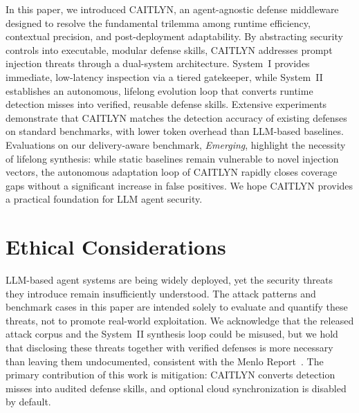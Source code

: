 \documentclass[letterpaper,twocolumn,10pt]{article}
\begin{document}
In this paper, we introduced CAITLYN, an agent-agnostic defense
middleware designed to resolve the fundamental trilemma among runtime
efficiency, contextual precision, and post-deployment adaptability.
By abstracting security controls into executable,
modular defense skills, CAITLYN addresses prompt injection threats
through a dual-system architecture. System~I provides immediate,
low-latency inspection via a tiered gatekeeper, while System~II
establishes an autonomous, lifelong evolution loop that converts
runtime detection misses into verified, reusable defense skills.
Extensive experiments demonstrate that CAITLYN matches the detection
accuracy of existing defenses on standard benchmarks, with
lower token overhead than LLM-based baselines.
Evaluations on our
delivery-aware benchmark, \emph{Emerging}, highlight the necessity of
lifelong synthesis: while static baselines remain vulnerable to
novel injection vectors, the autonomous adaptation loop of CAITLYN
rapidly closes coverage gaps
without a significant increase in false positives.
We hope CAITLYN provides a practical foundation for
LLM agent security.





\clearpage
\appendix
\section*{Ethical Considerations}

LLM-based agent systems are being widely deployed, yet the security
threats they introduce remain insufficiently understood. The attack
patterns and benchmark cases in this paper are intended solely to
evaluate and quantify these threats, not to promote real-world
exploitation. We acknowledge that the released attack corpus and the
System~II synthesis loop could be misused, but we hold that disclosing
these threats together with verified defenses is more necessary than
leaving them undocumented, consistent with the Menlo
Report~\cite{menlo2012}. The primary contribution of this work is
mitigation: CAITLYN converts detection misses into audited defense
skills, and optional cloud synchronization is disabled by default.
\end{document}
